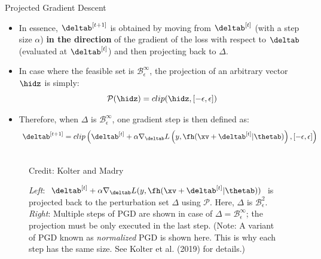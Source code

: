 \begin{vbframe}{Projected Gradient Descent}
\begin{itemize}
        
        
        \item In essence, $\deltab^{[t+1]}$ is obtained by moving from $\deltab^{[t]}$ (with a step size $\alpha$) \textbf{in the direction} of the gradient of the loss with respect to $\deltab$ (evaluated at $\deltab^{[t]}$) and then projecting back to $\Delta$.
        \item In case where the feasible set is $\mathcal{B}^{\infty}_{\epsilon}$, the projection of an arbitrary vector $\hidz$ is simply:
        \begin{equation*}
            \mathcal{P}(\hidz) = clip(\hidz, [-\epsilon, \epsilon])
        \end{equation*}
        \item Therefore, when $\Delta$ is $\mathcal{B}^{\infty}_{\epsilon}$, one gradient step is then defined as: 
        \begin{equation*}
            \deltab^{[t+1]} = clip\left(\deltab^{[t]}+ \alpha \nabla_{\deltab} L\left(y, \fh(\xv + \deltab^{[t]}| \thetab) \right), [-\epsilon, \epsilon]\right)
        \end{equation*}
        \end{itemize}
        \vspace{-0.5cm}
          \begin{figure}
    \centering
      \tiny{\\Credit: Kolter and Madry}
      \caption{\small{\textit{Left}: $\deltab^{[t]}+ \alpha \nabla_{\deltab} L(y, \fh(\xv + \deltab^{[t]}| \thetab))$ is projected back to the perturbation set $\Delta$ using $\mathcal{P}$. Here, $\Delta$ is $\mathcal{B}^{2}_{\epsilon}$.
      \textit{Right}: Multiple steps of PGD are shown in case of $\Delta = \mathcal{B}^{\infty}_{\epsilon}$; the projection must be only executed in the last step. (Note: A variant of PGD known as \textit{normalized} PGD is shown here. This is why each step has the same size. See Kolter et al. (2019) for details.)}}
  \end{figure}
    
\end{vbframe}
   
